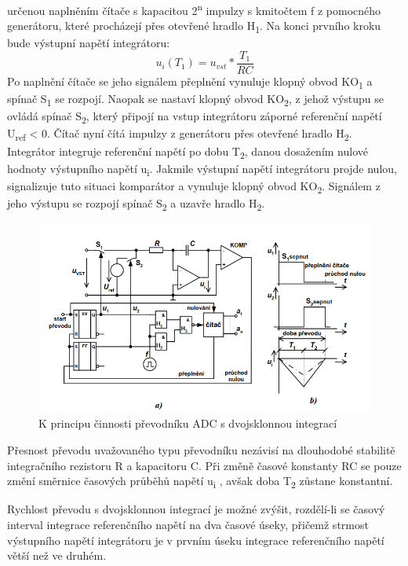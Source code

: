 určenou naplněním čítače s kapacitou 2\textsuperscript{n} impulzy s kmitočtem f z pomocného generátoru, které procházejí přes otevřené hradlo H\textsubscript{1}. Na konci prvního kroku bude výstupní napětí integrátoru:
\begin{equation}
u_{i}(T_{1})=u_{vst}*\frac{T_{1}}{RC}
\end{equation}
Po naplnění čítače se jeho signálem přeplnění vynuluje klopný obvod KO\textsubscript{1} a spínač S\textsubscript{1} se rozpojí. Naopak se nastaví klopný obvod KO\textsubscript{2}, z jehož výstupu se ovládá spínač S\textsubscript{2}, který připojí na vstup integrátoru záporné referenční napětí U\textsubscript{ref} < 0. Čítač nyní čítá impulzy z generátoru přes otevřené hradlo H\textsubscript{2}. Integrátor integruje referenční napětí po dobu T\textsubscript{2}, danou dosažením nulové hodnoty výstupního napětí u\textsubscript{i}. Jakmile výstupní napětí integrátoru projde nulou, signalizuje tuto situaci komparátor a vynuluje klopný obvod KO\textsubscript{2}. Signálem z jeho výstupu se rozpojí spínač S\textsubscript{2} a uzavře hradlo H\textsubscript{2}.
\begin{figure}[h]
   \begin{center}
     \includegraphics[scale=0.6]{images/ADdvoj.png}
   \end{center}
   \caption{K principu činnosti převodníku ADC s dvojsklonnou integrací}
\end{figure}

\pagebreak
Přesnost převodu uvažovaného typu převodníku nezávisí na dlouhodobé stabilitě integračního rezistoru R a kapacitoru C. Při změně časové konstanty RC se pouze změní směrnice časových průběhů napětí u\textsubscript{i} , avšak doba T\textsubscript{2} zůstane konstantní.

Rychlost převodu s dvojsklonnou integrací je možné zvýšit, rozdělí-li se časový interval integrace referenčního napětí na dva časové úseky, přičemž strmost výstupního napětí integrátoru je v prvním úseku integrace referenčního napětí větší než ve druhém.










